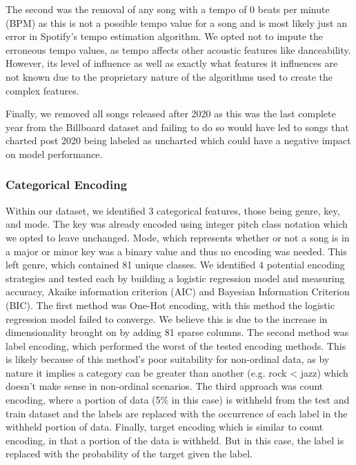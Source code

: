 \documentclass[conference]{IEEEtran}
\begin{document}
The second was the removal of any song with a tempo of 0 beats per minute (BPM) as this is not a possible tempo value for a song and is most likely just an error in Spotify's tempo estimation algorithm.\cite{b20} We opted not to impute the erroneous tempo values, as tempo affects other acoustic features like danceability. However, its level of influence as well as exactly what features it influences are not known due to the proprietary nature of the algorithms used to create the complex features.

Finally, we removed all songs released after 2020 as this was the last complete year from the Billboard dataset and failing to do so would have led to songs that charted post 2020 being labeled as uncharted which could have a negative impact on model performance.

\subsubsection{Categorical Encoding}
Within our dataset, we identified 3 categorical features, those being genre, key, and mode. The key was already encoded using integer pitch class notation
which we opted to leave unchanged. Mode, which represents whether or not a song is in a major or minor key was a binary value and thus no encoding was needed. This left genre, which contained 81 unique classes. We identified 4 potential encoding strategies and tested each by building a logistic regression model and measuring accuracy, Akaike information criterion (AIC) and Bayesian Information Criterion (BIC). The first method was One-Hot encoding, with this method the logistic regression model failed to converge. We believe this is due to the increase in dimensionality brought on by adding 81 sparse columns. The second method was label encoding, which performed the worst of the tested encoding methods. This is likely because of this method's poor suitability for non-ordinal data, as by nature it implies a category can be greater than another (e.g. rock < jazz) which doesn't make sense in non-ordinal scenarios. The third approach was count encoding, where a portion of data (5\% in this case) is withheld from the test and train dataset and the labels are replaced with the occurrence of each label in the withheld portion of data. Finally, target encoding which is similar to count encoding, in that a portion of the data is withheld. But in this case, the label is replaced with the probability of the target given the label.
\end{document}
